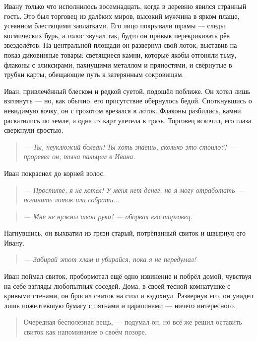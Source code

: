 \documentclass[12pt,a4paper]{book} %
\newenvironment{dialogue}{\begin{quote}\itshape}{\end{quote}}
\begin{document}
Ивану только что исполнилось восемнадцать, когда в деревню явился странный гость. Это был торговец из далёких миров, высокий мужчина в ярком плаще, усеянном блестящими заплатками. Его лицо покрывали шрамы --- следы космических бурь, а голос звучал так, будто он привык перекрикивать рёв звездолётов. На центральной площади он развернул свой лоток, выставив на показ диковинные товары: светящиеся камни, которые якобы отгоняли тьму, флаконы с эликсирами, пахнущими металлом и пряностями, и свёрнутые в трубки карты, обещающие путь к затерянным сокровищам.

Иван, привлечённый блеском и редкой суетой, подошёл поближе. Он хотел лишь взглянуть --- но, как обычно, его присутствие обернулось бедой. Споткнувшись о невидимую кочку, он с грохотом врезался в лоток. Флаконы разбились, камни раскатились по земле, а одна из карт улетела в грязь. Торговец вскочил, его глаза сверкнули яростью.

\begin{dialogue}
--- Ты, неуклюжий болван! Ты хоть знаешь, сколько это стоило?! --- проревел он, тыча пальцем в Ивана.
\end{dialogue}

Иван покраснел до корней волос.

\begin{dialogue}
--- Простите, я не хотел! У меня нет денег, но я могу отработать --- починить лоток или собрать...
\end{dialogue}

\begin{dialogue}
--- Мне не нужны твои руки! --- оборвал его торговец.
\end{dialogue}

Нагнувшись, он выхватил из грязи старый, потрёпанный свиток и швырнул его Ивану.

\begin{dialogue}
--- Забирай этот хлам и убирайся, пока я не передумал!
\end{dialogue}

Иван поймал свиток, пробормотал ещё одно извинение и побрёл домой, чувствуя на себе взгляды любопытных соседей. Дома, в своей тесной комнатушке с кривыми стенами, он бросил свиток на стол и вздохнул. Развернув его, он увидел лишь пожелтевшую бумагу с пятнами и царапинами --- ничего интересного.

\begin{quote}
Очередная бесполезная вещь, --- подумал он, но всё же решил оставить свиток как напоминание о своём позоре.
\end{quote}
\end{document}
